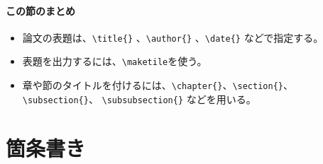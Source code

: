 \paragraph{この節のまとめ}

\begin{itemize}
    \item 論文の表題は、\verb|\title{}| 、\verb|\author{}| 、\verb|\date{}| などで指定する。
    \item 表題を出力するには、\verb|\maketile|を使う。
    \item 章や節のタイトルを付けるには、\verb|\chapter{}|、\verb|\section{}|、 \verb|\subsection{}|、 \verb|\subsubsection{}| などを用いる。
\end{itemize}

\section{箇条書き}
\label{sec:latex:itemize}

